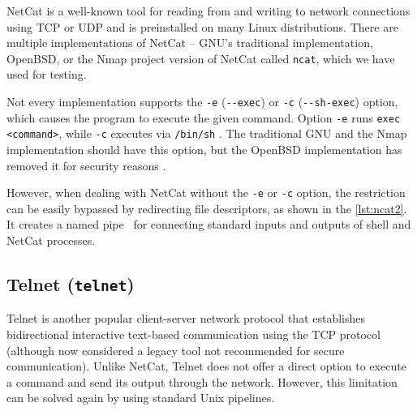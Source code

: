 
NetCat is a well-known tool for reading from and writing to network connections using TCP or UDP and is preinstalled on many Linux distributions. There are multiple implementations of NetCat -- GNU's traditional implementation, OpenBSD, or the Nmap project version of NetCat called \texttt{ncat}, which we have used for testing.

Not every implementation supports the \texttt{-e} (\texttt{-{}-exec}) or \texttt{-c} (\texttt{-{}-sh-exec}) option, which causes the program to execute the given command. Option \texttt{-e} runs \texttt{exec <command>}, while \texttt{-c} executes via \texttt{/bin/sh} \cite{ncat-man}. The traditional GNU and the Nmap implementation should have this option, but the OpenBSD implementation has removed it for security reasons \cite{nc-man}.



However, when dealing with NetCat without the \texttt{-e} or \texttt{-c} option, the restriction can be easily bypassed by redirecting file descriptors, as shown in the \cref{lst:ncat2}. It creates a named pipe \tmp\ for connecting standard inputs and outputs of shell and NetCat processes.




\subsection{Telnet (\texttt{telnet})} \label{telnet}


Telnet is another popular client-server network protocol that establishes bidirectional interactive text-based communication using the TCP protocol (although now considered a legacy tool not recommended for secure communication). Unlike NetCat, Telnet does not offer a direct option to execute a command and send its output through the network. However, this limitation can be solved again by using standard Unix pipelines.

